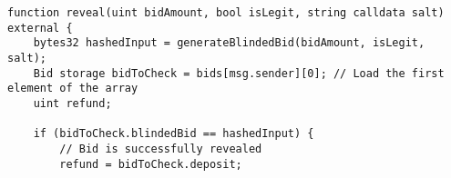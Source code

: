 \begin{lstlisting}[language=Solidity]
function reveal(uint bidAmount, bool isLegit, string calldata salt) external {
	bytes32 hashedInput = generateBlindedBid(bidAmount, isLegit, salt);
	Bid storage bidToCheck = bids[msg.sender][0]; // Load the first element of the array
	uint refund;

	if (bidToCheck.blindedBid == hashedInput) {
		// Bid is successfully revealed
		refund = bidToCheck.deposit;
\end{lstlisting}